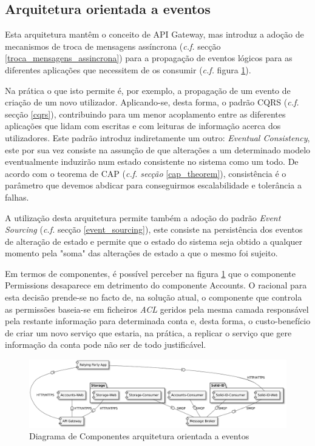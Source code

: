 \subsection{Arquitetura orientada a eventos} \label{subsection:arquitetura_2}

Esta arquitetura mantêm o conceito de API Gateway, mas introduz a adoção de mecanismos de troca de mensagens assíncrona (\emph{c.f.} secção \ref{troca_mensagens_assincrona}) para a propagação de eventos lógicos para as diferentes aplicações que necessitem de os consumir (\emph{c.f.} figura \ref{component_diagram_arquitetura2}).

Na prática o que isto permite é, por exemplo, a propagação de um evento de criação de um novo utilizador. Aplicando-se, desta forma, o padrão CQRS (\emph{c.f.} secção \ref{cqrs}), contribuindo para um menor acoplamento entre as diferentes aplicações que lidam com escritas e com leituras de informação acerca dos utilizadores. Este padrão introduz indiretamente um outro: \emph{Eventual Consistency}, este por sua vez consiste na assunção de que alterações a um determinado modelo eventualmente induzirão num estado consistente no sistema como um todo. De acordo com o teorema de \acrshort{CAP} (\emph{\emph{c.f.} secção} \ref{cap_theorem}), consistência é o parâmetro que devemos abdicar para conseguirmos escalabilidade e tolerância a falhas.

A utilização desta arquitetura permite também a adoção do padrão \emph{Event Sourcing} (\emph{c.f.} secção \ref{event_sourcing}), este consiste na persistência dos eventos de alteração de estado e permite que o estado do sistema seja obtido a qualquer momento pela "soma" das alterações de estado a que o mesmo foi sujeito.

Em termos de componentes, é possível perceber na figura \ref{component_diagram_arquitetura2} que o componente Permissions desaparece em detrimento do componente Accounts. O racional para esta decisão prende-se no facto de, na solução atual, o componente que controla as permissões baseia-se em ficheiros \emph{\acrshort{ACL}} geridos pela mesma camada responsável pela restante informação para determinada conta e, desta forma, o custo-benefício de criar um novo serviço que estaria, na prática, a replicar o serviço que gere informação da conta pode não ser de todo justificável.

\begin{figure}[H]
    \begin{center}
    \includegraphics[width=1 \textwidth]{figures/arquitetura_2_diagrama_componentes.eps}
    \caption{Diagrama de Componentes arquitetura orientada a eventos}
    \label{component_diagram_arquitetura2}
    \end{center}
\end{figure}

